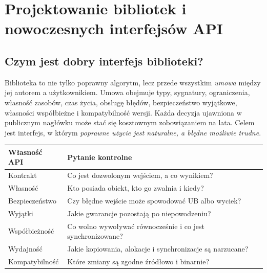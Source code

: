 \chapter{Projektowanie bibliotek i nowoczesnych interfejsów API}
\label{chap:cpp20-api}

\section{Czym jest dobry interfejs biblioteki?}

Biblioteka to nie tylko poprawny algorytm, lecz przede wszystkim
\emph{umowa} między jej autorem a użytkownikiem. Umowa obejmuje typy,
sygnatury, ograniczenia, własność zasobów, czas życia, obsługę błędów,
bezpieczeństwo wyjątkowe, własności współbieżne i kompatybilność wersji.
Każda decyzja ujawniona w publicznym nagłówku może stać się
kosztownym zobowiązaniem na lata. Celem jest interfejs, w którym
\emph{poprawne użycie jest naturalne, a błędne możliwie trudne}.

\begin{center}\small
\begin{tabularx}{\textwidth}{@{}p{}X@{}}
\toprule
Własność API & Pytanie kontrolne \\
\midrule
Kontrakt & Co jest dozwolonym wejściem, a co wynikiem? \\
Własność & Kto posiada obiekt, kto go zwalnia i kiedy? \\
Bezpieczeństwo & Czy błędne wejście może spowodować UB albo wyciek? \\
Wyjątki & Jakie gwarancje pozostają po niepowodzeniu? \\
Współbieżność & Co wolno wywoływać równocześnie i co jest synchronizowane? \\
Wydajność & Jakie kopiowania, alokacje i synchronizacje są narzucane? \\
Kompatybilność & Które zmiany są zgodne źródłowo i binarnie? \\
\bottomrule
\end{tabularx}
\end{center}


